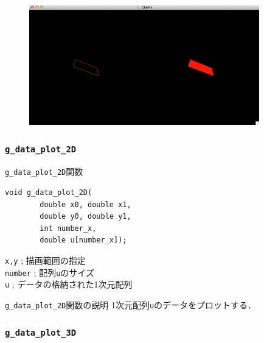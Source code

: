 \documentclass[platex,a4paper,12pt]{jsarticle}%
\begin{document}
\begin{figure}[htb]
\centering
	\includegraphics[width=100mm]{./Figures/eps/Canvas_g_rectangle.eps}
\end{figure}




\clearpage
\subsubsection{\texttt{g\_data\_plot\_2D}}

\begin{itembox}[l]{\texttt{g\_data\_plot\_2D}関数}
\begin{verbatim}
void g_data_plot_2D(
        double x0, double x1,
        double y0, double y1,
        int number_x,
        double u[number_x]);
\end{verbatim}
\verb|x,y| ; 描画範囲の指定\\
\verb|number| ; 配列\verb|u|のサイズ\\
\verb|u| ; データの格納された1次元配列
\end{itembox}

\begin{itembox}[l]{\texttt{g\_data\_plot\_2D}関数の説明}
1次元配列\verb|u|のデータをプロットする．
\end{itembox}



\clearpage
\subsubsection{\texttt{g\_data\_plot\_3D}}
\end{document}
